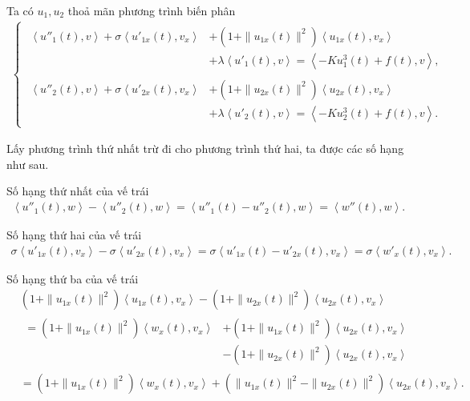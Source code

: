 \documentclass[12pt,a4paper]{article}
\theoremstyle{definition}
\begin{document}
Ta có $u_1,u_2$ thoả mãn phương trình biến phân
\begin{align*}
\begin{cases}
    \begin{aligned}
        \left<u''_1(t),v\right> + \sigma \left<u'_{1x}(t),v_x\right> &+ \left(1+\|u_{1x}(t)\|^2\right) \left<u_{1x}(t),v_x\right> \\[0.1cm] &+ \lambda \left<u'_1(t),v\right> = \left<-Ku^3_1(t) + f(t),v\right>,
    \end{aligned} \\[0.4cm]
    \begin{aligned}
         \left<u''_2(t),v\right> + \sigma \left<u'_{2x}(t),v_x\right> &+ \left(1+\|u_{2x}(t)\|^2\right) \left<u_{2x}(t),v_x\right> \\[0.1cm] &+ \lambda \left<u'_2(t),v\right> = \left<-Ku^3_2(t) + f(t),v\right>.
    \end{aligned}
\end{cases}
\end{align*}

Lấy phương trình thứ nhất trừ đi cho phương trình thứ hai, ta được các số hạng như sau.

Số hạng thứ nhất của vế trái
\begin{align*}
    \left<u''_1(t),w\right> - \left<u''_2(t),w\right> = \left<u''_1(t) - u''_2(t),w\right> = \left<w''(t),w\right>.
\end{align*}

Số hạng thứ hai của vế trái
\begin{align*}
    \sigma \left<u'_{1x}(t),v_x\right> - \sigma \left<u'_{2x}(t),v_x\right>
    = \sigma \left<u'_{1x}(t) - u'_{2x}(t),v_x\right> 
    = \sigma \left<w'_x(t),v_x\right>.
\end{align*}

Số hạng thứ ba của vế trái
\begin{align*}
    &\left(1+\|u_{1x}(t)\|^2\right) \left<u_{1x}(t),v_x\right> - \left(1+\|u_{2x}(t)\|^2\right) \left<u_{2x}(t),v_x\right> \\
    &\begin{aligned}
        = \left(1+\|u_{1x}(t)\|^2\right) \left<w_x(t),v_x\right> &+ \left(1+\|u_{1x}(t)\|^2\right) \left<u_{2x}(t),v_x\right> \\ &-\left(1+\|u_{2x}(t)\|^2\right) \left<u_{2x}(t),v_x\right>
    \end{aligned} \\
    &= \left(1+\|u_{1x}(t)\|^2\right) \left<w_x(t),v_x\right> + \left(\|u_{1x}(t)\|^2 - \|u_{2x}(t)\|^2\right) \left<u_{2x}(t),v_x\right>.
\end{align*}
\end{document}
